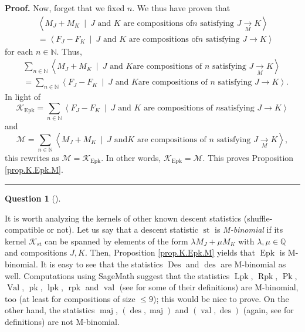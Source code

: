 \documentclass[numbers=enddot,12pt,final,onecolumn,notitlepage]{scrartcl}%
\theoremstyle{definition}
\newtheorem{quest}[theo]{Question}
\newenvironment{question}[1][]
{\begin{quest}[#1]\begin{leftbar}}
{\end{leftbar}\end{quest}}
\newenvironment{proof}[1][Proof]{\noindent\textbf{#1.} }{\ \rule{0.5em}{0.5em}}
\newenvironment{question}[1][Question]{\noindent\textbf{#1.} }{\ \rule{0.5em}{0.5em}}
\newenvironment{verlong}{}{}
\let\sumnonlimits\sum
\renewcommand{\sum}{\sumnonlimits\limits}
\begin{document}
\begin{verlong}
\begin{proof}
Now, forget that we fixed $n$. We thus have proven that
\begin{align*}
&  \left\langle M_{J}+M_{K}\ \mid\ J\text{ and }K\text{ are compositions of
}n\text{ satisfying }J\underset{M}{\rightarrow}K\right\rangle \\
&  =\left\langle F_{J}-F_{K}\ \mid\ J\text{ and }K\text{ are compositions of
}n\text{ satisfying }J\rightarrow K\right\rangle
\end{align*}
for each $n\in\mathbb{N}$. Thus,%
\begin{align*}
&  \sum_{n\in\mathbb{N}}\left\langle M_{J}+M_{K}\ \mid\ J\text{ and }K\text{
are compositions of }n\text{ satisfying }J\underset{M}{\rightarrow
}K\right\rangle \\
&  =\sum_{n\in\mathbb{N}}\left\langle F_{J}-F_{K}\ \mid\ J\text{ and }K\text{
are compositions of }n\text{ satisfying }J\rightarrow K\right\rangle .
\end{align*}
In light of%
\[
\mathcal{K}_{\operatorname{Epk}}=\sum_{n\in\mathbb{N}}\left\langle
F_{J}-F_{K}\ \mid\ J\text{ and }K\text{ are compositions of }n\text{
satisfying }J\rightarrow K\right\rangle
\]
and%
\[
\mathcal{M}=\sum_{n\in\mathbb{N}}\left\langle M_{J}+M_{K}\ \mid\ J\text{ and
}K\text{ are compositions of }n\text{ satisfying }J\underset{M}{\rightarrow
}K\right\rangle ,
\]
this rewrites as $\mathcal{M}=\mathcal{K}_{\operatorname{Epk}}$. In other
words, $\mathcal{K}_{\operatorname{Epk}}=\mathcal{M}$. This proves
Proposition \ref{prop.K.Epk.M}.
\end{proof}
\end{verlong}

\begin{question}
It is worth analyzing the kernels of other known descent statistics
(shuffle-compatible or not).
Let us say that a descent statistic $\operatorname{st}$ is
\textit{M-binomial}
if its kernel $\mathcal{K}_{\operatorname{st}}$ can be spanned by
elements of the form $\lambda M_{J}+\mu M_{K}$ with
$\lambda, \mu \in \mathbb{Q}$ and compositions $J,K$.
Then, Proposition \ref{prop.K.Epk.M} yields that $\operatorname{Epk}$
is M-binomial.
It is easy to see that the statistics $\operatorname{Des}$ and
$\operatorname{des}$ are M-binomial as well.
Computations using SageMath suggest that the statistics
$\operatorname{Lpk}$, $\operatorname{Rpk}$, $\operatorname*{Pk}$,
$\operatorname{Val}$,
$\operatorname{pk}$, $\operatorname{lpk}$, $\operatorname{rpk}$
and $\operatorname{val}$
(see \cite{part1} for some of their definitions) are M-binomial, too
(at least for compositions of size $\leq 9$);
this would be nice to prove.
On the other hand, the statistics
$\operatorname{maj}$, $\left(\operatorname{des},\operatorname{maj}\right)$
and $\left(\operatorname{val},\operatorname{des}\right)$ (again, see
\cite{part1} for definitions) are not M-binomial.
\end{question}
\end{document}
